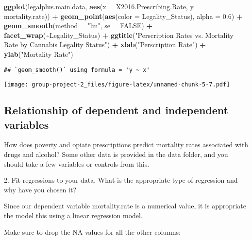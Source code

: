 \documentclass[
]{article}
\newenvironment{Shaded}{\begin{snugshade}}{\end{snugshade}}
\newcommand{\AttributeTok}[1]{\textcolor[rgb]{0.13,0.29,0.53}{#1}}
\newcommand{\ConstantTok}[1]{\textcolor[rgb]{0.56,0.35,0.01}{#1}}
\newcommand{\FloatTok}[1]{\textcolor[rgb]{0.00,0.00,0.81}{#1}}
\newcommand{\FunctionTok}[1]{\textcolor[rgb]{0.13,0.29,0.53}{\textbf{#1}}}
\newcommand{\NormalTok}[1]{#1}
\newcommand{\SpecialCharTok}[1]{\textcolor[rgb]{0.81,0.36,0.00}{\textbf{#1}}}
\newcommand{\StringTok}[1]{\textcolor[rgb]{0.31,0.60,0.02}{#1}}
\begin{document}
\begin{Shaded}
\begin{Highlighting}[]
\FunctionTok{ggplot}\NormalTok{(legalplus.main.data, }\FunctionTok{aes}\NormalTok{(}\AttributeTok{x =}\NormalTok{ X2016.Prescribing.Rate, }\AttributeTok{y =}\NormalTok{ mortality.rate)) }\SpecialCharTok{+}
  \FunctionTok{geom\_point}\NormalTok{(}\FunctionTok{aes}\NormalTok{(}\AttributeTok{color =}\NormalTok{ Legality\_Status), }\AttributeTok{alpha =} \FloatTok{0.6}\NormalTok{) }\SpecialCharTok{+}
  \FunctionTok{geom\_smooth}\NormalTok{(}\AttributeTok{method =} \StringTok{"lm"}\NormalTok{, }\AttributeTok{se =} \ConstantTok{FALSE}\NormalTok{) }\SpecialCharTok{+}
  \FunctionTok{facet\_wrap}\NormalTok{(}\SpecialCharTok{\textasciitilde{}}\NormalTok{Legality\_Status) }\SpecialCharTok{+}
  \FunctionTok{ggtitle}\NormalTok{(}\StringTok{"Perscription Rates vs. Mortality Rate by Cannabis Legality Status"}\NormalTok{) }\SpecialCharTok{+}
  \FunctionTok{xlab}\NormalTok{(}\StringTok{"Perscription Rate"}\NormalTok{) }\SpecialCharTok{+}
  \FunctionTok{ylab}\NormalTok{(}\StringTok{"Mortality Rate"}\NormalTok{)}
\end{Highlighting}
\end{Shaded}

\begin{verbatim}
## `geom_smooth()` using formula = 'y ~ x'
\end{verbatim}

\texttt{[image: group-project-2\_files/figure-latex/unnamed-chunk-5-7.pdf]}

\hypertarget{relationship-of-dependent-and-independent-variables}{%
\subsection{Relationship of dependent and independent
variables}\label{relationship-of-dependent-and-independent-variables}}

How does poverty and opiate prescriptions predict mortality rates
associated with drugs and alcohol? Some other data is provided in the
data folder, and you should take a few variables or controls from this.

2. Fit regressions to your data. What is the appropriate type of
regression and why have you chosen it?

Since our dependent variable mortality.rate is a numerical value, it is
appropriate the model this using a linear regression model.

Make sure to drop the NA values for all the other columns:
\end{document}
